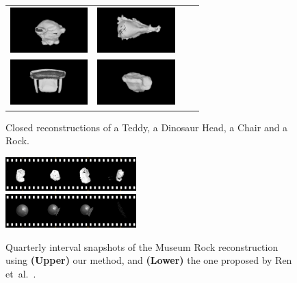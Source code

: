 \begin{figure}[!t]
	\centering
	\begin{tabular}{cccc}
		\includegraphics[width=3cm]{screenshots/untextured/teddy_top00.png}&
		\includegraphics[width=3cm]{screenshots/untextured/dino_top00.png}\\
		\includegraphics[width=3cm]{screenshots/untextured/chair_top00.png}&
		\includegraphics[width=3cm]{screenshots/untextured/rock_top00.png}\\
	\end{tabular}
    \vspace{-3mm}
	\caption{
		Closed reconstructions of a Teddy, a Dinosaur Head, a Chair and a Rock.
	}
	\label{fig:top_shots}
\end{figure}

\begin{figure}[!t]
	\centering
		\includegraphics[width=0.45\textwidth]{filmstrips/rock.png} \\
		\vspace{0.3mm}
	    \hspace{0.5mm} \includegraphics[width=0.45\textwidth]{filmstrips/rock_s3d_large.png}
	\caption{
		Quarterly interval snapshots of the Museum Rock reconstruction using \textbf{(Upper)} our method, and \textbf{(Lower)} the one proposed by Ren et~al.~\cite{Ren2013}.
	}
	\label{fig:rockComparison}
\end{figure}

